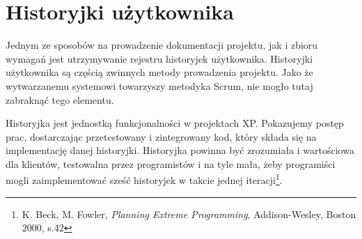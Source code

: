 



\thispagestyle{empty}
\kartapracy
\myemptypage

\linespread{1.49}
\thispagestyle{empty}
\stronatytulowa

\normalsize
\oswiadczenie
\newpage


\myemptypage

\tableofcontents
\newpage
\listoffigures
\newpage
\listoftables
\newpage

\setcounter{licznikStron}{\value{page}}
\setcounter{licznikStron}{1}
\setcounter{page}{\value{licznikStron}}




\section{Historyjki użytkownika}
Jednym ze sposobów na prowadzenie dokumentacji projektu, jak i zbioru wymagań jest utrzymywanie rejestru historyjek użytkownika. Historyjki użytkownika są częścią zwinnych metody prowadzenia projektu. Jako że wytwarzanemu systemowi towarzyszy metodyka Scrum, nie mogło tutaj zabraknąć tego elementu.

\begin{italicquote}
	Historyjka jest jednostką funkcjonalności w projektach XP. Pokazujemy postęp prac, dostarczając przetestowany i zintegrowany kod, który składa się na implementację danej historyjki. Historyjka powinna być zrozumiała i wartościowa dla klientów, testowalna przez programistów i na tyle mała, żeby programiści mogli zaimplementować sześć historyjek w takcie jednej iteracji\footnote{K. Beck, M. Fowler, \textit{Planning Extreme Programming}, Addison-Wesley, Boston 2000, s.42}.
\end{italicquote}

